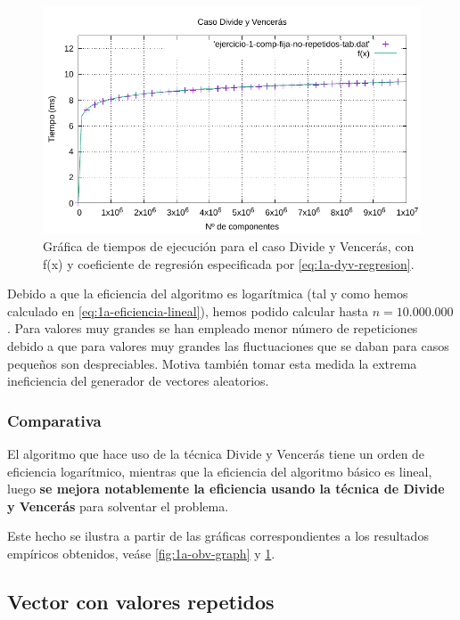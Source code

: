 \begin{figure}
	\centering
	\includegraphics[scale=0.76]{img/e1a-dyv}
	\caption{Gráfica de tiempos de ejecución para el caso Divide y Vencerás, 
		con f(x) y coeficiente de regresión especificada por \ref{eq:1a-dyv-regresion}.}
	\label{fig:1a-dyv-graph}
\end{figure}

Debido a que la eficiencia del algoritmo es logarítmica (tal y como hemos calculado en \ref{eq:1a-eficiencia-lineal}),
hemos podido calcular hasta $n = 10.000.000$. Para valores muy grandes se han empleado menor número de repeticiones
debido a que para valores muy grandes las fluctuaciones que se daban para casos pequeños son despreciables. 
Motiva también tomar esta medida la extrema ineficiencia del generador de vectores aleatorios. 

\newpage

\subsubsection{Comparativa}

El algoritmo que hace uso de la técnica Divide y Vencerás tiene un orden de eficiencia logarítmico, mientras
que la eficiencia del algoritmo básico es lineal, luego \textbf{se mejora notablemente la eficiencia usando la técnica de 
Divide y Vencerás} para solventar el problema. 
   
Este hecho se ilustra a partir de las gráficas correspondientes a los resultados empíricos obtenidos, veáse 
\ref{fig:1a-obv-graph} y \ref{fig:1a-dyv-graph}.

\subsection{Vector con valores repetidos}

